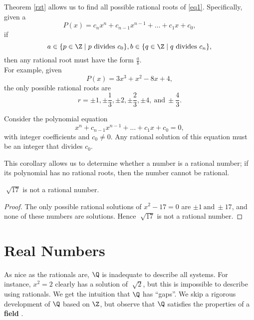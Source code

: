 \documentclass[math1010-lecture-notes]{subfiles}
\begin{document}
\begin{remark}
  Theorem \ref{rzt} allows us to find all possible rational roots of \ref{eq1}. Specifically, given
  a \[
    P(x) = c_nx^{n}+c_{n-1}x^{n-1}+\ldots+c_1x+c_0
  ,\] if \[
    a\in \{p \in \Z \mid p ~\text{divides}~ c_0\}, b\in \{q\in \Z\mid q ~\text{divides}~c_n\},
  \]
  then any rational root must have the form $\frac{a}{b}$.\\

  For example, given \[
    P(x) = 3x^3+x^2-8x+4
  ,\] the only possible rational roots are \[
    r = \pm 1, \pm \frac{1}{3}, \pm 2, \pm \frac{2}{3}, \pm 4, ~\text{and}~ \pm \frac{4}{3}
  .\] 
\end{remark}

\begin{corollary}[]{}
  Consider the polynomial equation \[
    x^{n}+c_{n-1}x^{n-1}+\ldots+c_1x+c_0=0
  ,\] with integer coefficients and $ c_0\neq 0$. Any rational solution of this equation must be an
  integer that divides $c_0$.
\end{corollary}
This corollary allows us to determine whether a number is a rational number; if its polynomial has
no rational roots, then the number cannot be rational.
\begin{example}
  $\sqrt[]{17} $ is not a rational number.
\end{example}
\begin{proof}[Proof]
  The only possible rational solutions of $x^2-17=0$ are $\pm 1 ~\text{and}~\pm 17$, and none of
  these numbers are solutions. Hence $\sqrt[]{17} $ is not a rational number.
\end{proof}


\section{Real Numbers}

As nice as the rationals are, $\Q$ is inadequate to describe all systems. For instance, $x^2=2$
clearly has a solution of $\sqrt[]{2} $, but this is impossible to describe using rationals. We get
the intuition that $\Q$ has ``gaps''. We skip a rigorous development of $\Q$ based on $\Z$, but
observe that $\Q$ satisfies the properties of a  \textbf{field} .
\end{document}

